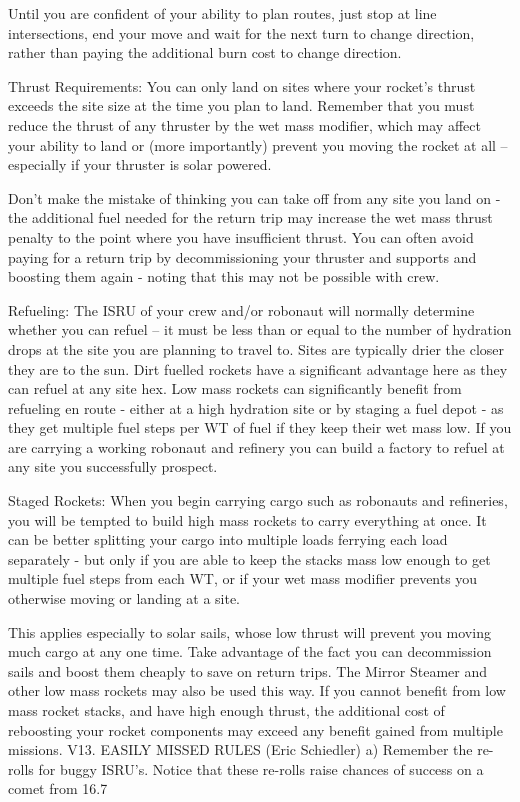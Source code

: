 \documentclass[a4paper]{book}
\begin{document}
Until you are confident of your ability to plan routes, just stop at line intersections, end your move and wait for the next turn to change direction, rather than paying the additional burn cost to change direction.

Thrust Requirements: You can only land on sites where your rocket’s thrust exceeds the site size at the time you plan to land. Remember that you must reduce the thrust of any thruster by the wet mass modifier, which may affect your ability to land or (more importantly) prevent you moving the rocket at all – especially if your thruster is solar powered.

Don’t make the mistake of thinking you can take off from any site you land on - the additional fuel needed for the return trip may increase the wet mass thrust penalty to the point where you have insufficient thrust. You can often avoid paying for a return trip by decommissioning your thruster and supports and boosting them again - noting that this may not be possible with crew.

Refueling: The ISRU of your crew and/or robonaut will normally determine whether you can refuel – it must be less than or equal to the number of hydration drops at the site you are planning to travel to. Sites are typically drier the closer they are to the sun. Dirt fuelled rockets have a significant advantage here as they can refuel at any site hex. Low mass rockets can significantly benefit from refueling en route - either at a high hydration site or by staging a fuel depot - as they get multiple fuel steps per WT of fuel if they keep their wet mass low.
If you are carrying a working robonaut and refinery you can build a factory to refuel at any site you successfully prospect.

Staged Rockets: When you begin carrying cargo such as robonauts and refineries, you will be tempted to build high mass rockets to carry everything at once. It can be better splitting your cargo into multiple loads ferrying each load separately - but only if you are able to keep the stacks mass low enough to get multiple fuel steps from each WT, or if your wet mass modifier prevents you otherwise moving or landing at a site.

This applies especially to solar sails, whose low thrust will prevent you moving much cargo at any one time. Take advantage of the fact you can decommission sails and boost them cheaply to save on return trips. The Mirror Steamer and other low mass rockets may also be used this way.
If you cannot benefit from low mass rocket stacks, and have high enough thrust, the additional cost of reboosting your rocket components may exceed any benefit gained from multiple missions.
V13. EASILY MISSED RULES (Eric Schiedler)
a) Remember the re-rolls for buggy ISRU's. Notice that these re-rolls raise chances of success on a comet from 16.7%
\end{document}

